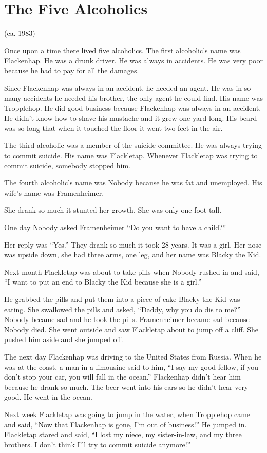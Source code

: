 \chapter{The Five Alcoholics}

(ca. 1983)

Once upon a time there lived five alcoholics. The first alcoholic’s name was Flackenhap. He was a drunk driver. He was always in accidents. He was very poor because he had to pay for all the damages.

Since Flackenhap was always in an accident, he needed an agent. He was in so many accidents he needed his brother, the only agent he could find. His name was Tropplehop. He did good business because Flackenhap was always in an accident. He didn’t know how to shave his mustache and it grew one yard long. His beard was so long that when it touched the floor it went two feet in the air.

The third alcoholic was a member of the suicide committee. He was always trying to commit suicide. His name was Flackletap. Whenever Flackletap was trying to commit suicide, somebody stopped him.

The fourth alcoholic’s name was Nobody because he was fat and unemployed. His wife’s name was Framenheimer.

She drank so much it stunted her growth. She was only one foot tall.

One day Nobody asked Framenheimer “Do you want to have a child?”

Her reply was “Yes.” They drank so much it took 28 years. It was a girl. Her nose was upside down, she had three arms, one leg, and her name was Blacky the Kid.

Next month Flackletap was about to take pills when Nobody rushed in and said, “I want to put an end to Blacky the Kid because she is a girl.”

He grabbed the pills and put them into a piece of cake Blacky the Kid was eating. She swallowed the pills and asked, “Daddy, why you do dis to me?” Nobody became sad and he took the pills. Framenheimer became sad because Nobody died. She went outside and saw Flackletap about to jump off a cliff. She pushed him aside and she jumped off.

The next day Flackenhap was driving to the United States from Russia. When he was at the coast, a man in a limousine said to him, “I say my good fellow, if you don’t stop your car, you will fall in the ocean.” Flackenhap didn’t hear him because he drank so much. The beer went into his ears so he didn’t hear very good. He went in the ocean.

Next week Flackletap was going to jump in the water, when Tropplehop came and said, “Now that Flackenhap is gone, I’m out of business!” He jumped in.
Flackletap stared and said, “I lost my niece, my sister-in-law, and my three brothers. I don’t think I’ll try to commit suicide anymore!”